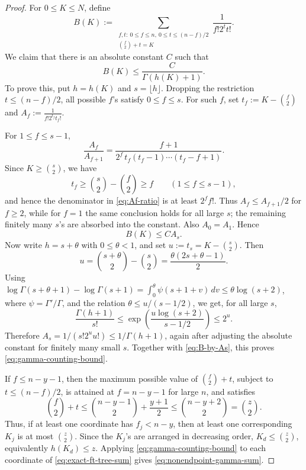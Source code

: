 \documentclass[10pt,a4paper]{amsart}
\renewcommand\le{\leqslant}
\renewcommand\ge{\geqslant}
\begin{document}
\begin{proof}
For $0\le K\le N$, define
\[
        B(K):=\sum_{\substack{f,t:\ 0\le f\le n,\ 0\le t\le(n-f)/2\\ \binom f2+t=K}}
        \frac1{f!2^t t!}.
\]
We claim that there is an absolute constant $C$ such that
\begin{equation}\label{eq:gamma-counting-bound}
        B(K)\le \frac{C}{\Gamma(h(K)+1)}.
\end{equation}
To prove this, put $h=h(K)$ and $s=\lfloor h\rfloor$. Dropping the restriction $t\le(n-f)/2$, all possible $f$'s satisfy $0\le f\le s$. For such $f$, set
$t_f:=K-\binom f2$ and $A_f:=\frac1{f!2^{t_f}t_f!}$.

For $1\le f\le s-1$,
\begin{equation}\label{eq:Af-ratio}
        \frac{A_f}{A_{f+1}}
        =\frac{f+1}{2^f\,t_f(t_f-1)\cdots(t_f-f+1)}.
\end{equation}
Since $K\ge\binom{s}{2}$, we have
\[
        t_f\ge \binom{s}{2}-\binom f2\ge f
        \qquad (1\le f\le s-1),
\]
and hence the denominator in \eqref{eq:Af-ratio} is at least $2^f f!$. Thus $A_f\le A_{f+1}/2$ for $f\ge2$, while for $f=1$ the same conclusion holds for all large $s$; the remaining finitely many $s$'s are absorbed into the constant. Also $A_0=A_1$. Hence
\begin{equation}\label{eq:B-by-As}
        B(K)\le C A_s .
\end{equation}
Now write $h=s+\theta$ with $0\le\theta<1$, and set $u:=t_s=K-\binom{s}{2}$. Then
\[
        u=\binom{s+\theta}{2}-\binom{s}{2}
          =\frac{\theta(2s+\theta-1)}2.
\]
Using $\log\Gamma(s+\theta+1)-\log\Gamma(s+1)=\int_0^\theta\psi(s+1+v)\,dv\le \theta\log(s+2)$, where $\psi=\Gamma'/\Gamma$, and the relation $\theta\le u/(s-1/2)$, we get, for all large $s$,
\[
        \frac{\Gamma(h+1)}{s!}
        \le \exp\left(\frac{u\log(s+2)}{s-1/2}\right)
        \le 2^u .
\]
Therefore $A_s=1/(s!2^u u!)\le 1/\Gamma(h+1)$, again after adjusting the absolute constant for finitely many small $s$. Together with \eqref{eq:B-by-As}, this proves \eqref{eq:gamma-counting-bound}.

If $f\le n-y-1$, then the maximum possible value of $\binom f2+t$, subject to $t\le(n-f)/2$, is attained at $f=n-y-1$ for large $n$, and satisfies
\[
        \binom f2+t
        \le \binom{n-y-1}{2}+\frac{y+1}{2}
        \le \binom{n-y+2}{2}=\binom z2 .
\]
Thus, if at least one coordinate has $f_j<n-y$, then at least one corresponding $K_j$ is at most $\binom z2$. Since the $K_j$'s are arranged in decreasing order, $K_d\le\binom z2$, equivalently $h(K_d)\le z$. Applying \eqref{eq:gamma-counting-bound} to each coordinate of \eqref{eq:exact-ft-tree-sum} gives \eqref{eq:nonendpoint-gamma-sum}.
\end{proof}
\end{document}
